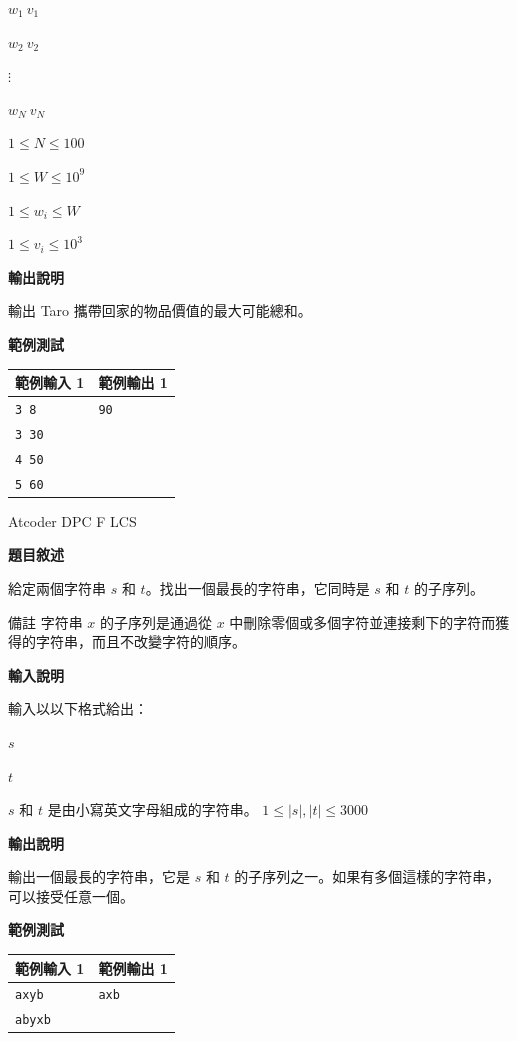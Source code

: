     $w_1\ v_1$

    $w_2\ v_2$

    $\vdots$

    $w_N\ v_N$

    $1 \le N \le 100$

    $1 \le W \le 10^9$

    $1 \le w_i \le W$

    $1 \le v_i \le 10^3$

    \textbf{輸出說明}

    輸出 Taro 攜帶回家的物品價值的最大可能總和。

    \textbf{範例測試}

    \begin{tabular}{|m{7cm}|m{7cm}|}
        \hline
        範例輸入 1 & 範例輸出 1 \\
        \hline
        \verb|3 8| & \verb|90| \\
        \verb|3 30| & \\
        \verb|4 50| & \\
        \verb|5 60| & \\
        \hline
    \end{tabular}

    \problem Atcoder DPC F LCS

    \textbf{題目敘述}

    給定兩個字符串
    $s$ 和
    $t$。找出一個最長的字符串，它同時是
    $s$ 和
    $t$ 的子序列。

    備註
    字符串
    $x$ 的子序列是通過從
    $x$ 中刪除零個或多個字符並連接剩下的字符而獲得的字符串，而且不改變字符的順序。

    \textbf{輸入說明}

    輸入以以下格式給出：

    $s$

    $t$

    $s$ 和 $t$ 是由小寫英文字母組成的字符串。
    $1\le |s|, |t|\le 3000$

    \textbf{輸出說明}

    輸出一個最長的字符串，它是
    $s$ 和
    $t$ 的子序列之一。如果有多個這樣的字符串，可以接受任意一個。

    \textbf{範例測試}

    \begin{tabular}{|m{7cm}|m{7cm}|}
        \hline
        範例輸入 1 & 範例輸出 1 \\
        \hline
        \verb|axyb| & \verb|axb| \\
        \verb|abyxb| & \\
        \hline
    \end{tabular}

